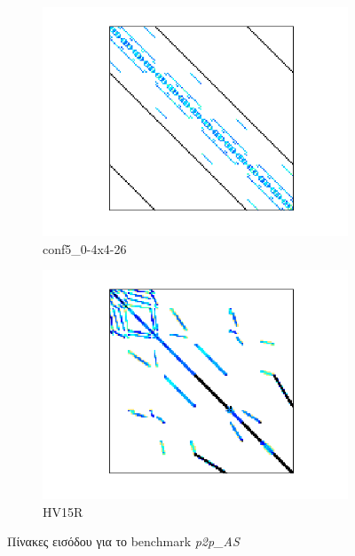 \begin{figure}[H]
\begin{subfigure}[b]{0.3\textwidth}
        \includegraphics[width=\textwidth]{./images/CG/conf5_0-4x4-26.png}
        \caption{conf5\_0-4x4-26}
    \end{subfigure}
    \quad 
    \begin{subfigure}[b]{0.3\textwidth}
        \includegraphics[width=\textwidth]{./images/CG/HV15R.png}
        \caption{HV15R}
    \end{subfigure}
    \quad 
    \caption{Πίνακες εισόδου για το benchmark \textit{p2p\_AS}}
    \label{fig:CG}
\end{figure}

